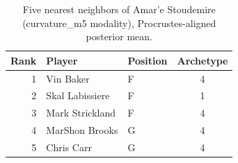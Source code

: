 \begin{table}[htbp]
  \centering\small
  \begin{tabular}{rllc}
    \toprule
    Rank & Player & Position & Archetype \\
    \midrule
    1 & Vin Baker & F & 4 \\
    2 & Skal Labissiere & F & 1 \\
    3 & Mark Strickland & F & 4 \\
    4 & MarShon Brooks & G & 4 \\
    5 & Chris Carr & G & 4 \\
    \bottomrule
  \end{tabular}
  \caption{Five nearest neighbors of Amar'e Stoudemire (curvature_m5 modality), Procrustes-aligned posterior mean.}
  \label{tab:Amar_e_Stoudemire_neighbors_curvature_m5}
\end{table}

